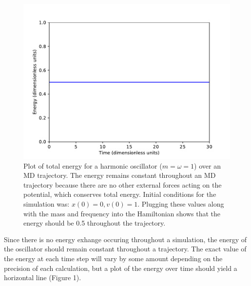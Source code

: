 \documentclass{article}
\begin{document}
\begin{figure}[H]
  \centering
  \includegraphics[scale=0.7]{Figures/1dverlet/energies.pdf}
    \caption{Plot of total energy for a harmonic oscillator ($m = \omega = 1$) over an MD trajectory. The energy remains constant throughout an MD trajectory because there are no other external forces acting on the potential, which conserves total energy. Initial conditions for the simulation was: $x(0) = 0, v(0) = 1$. Plugging these values along with the mass and frequency into the Hamiltonian shows that the energy should be 0.5 throughout the trajectory.}
\end{figure}

Since there is no energy exhange occuring throughout a simulation, the energy of the oscillator should remain constant throughout a trajectory. The exact value of the energy at each time step will vary by some amount depending on the precision of each calculation, but a plot of the energy over time should yield a horizontal line (Figure 1).
\end{document}
